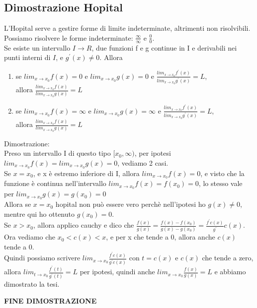 \documentclass[11pt]{article}
\begin{document}
\subsection{Dimostrazione Hopital}
L'Hopital serve a gestire forme di limite indeterminate, altrimenti non risolvibili.\\
Possiamo risolvere le forme indeterminate: $\frac{\infty}{\infty}$ e $\frac{0}{0}$.\\
Se esiste un intervallo $I \rightarrow R$, due funzioni f e g continue in I e derivabili nei punti interni di $I$, e $g^{'}(x) \neq 0$. Allora
\begin{enumerate}
    \item se $lim_{x \rightarrow x_{0}}f(x) = 0$ e $lim_{x \rightarrow x_{0}}g(x) = 0$ e 
    $\frac{lim_{x \rightarrow x_{0}}f^{'}(x)}{lim_{x \rightarrow x_{0}}g^{'}(x)} = L$,\\ allora 
    $\frac{lim_{x \rightarrow x_{0}}f(x)}{lim_{x \rightarrow x_{0}}g(x)} = L$
    \item se $lim_{x \rightarrow x_{0}}f(x) = \infty$ e $lim_{x \rightarrow x_{0}}g(x) = \infty$ e 
    $\frac{lim_{x \rightarrow x_{0}}f^{'}(x)}{lim_{x \rightarrow x_{0}}g^{'}(x)} = L$,\\ allora 
    $\frac{lim_{x \rightarrow x_{0}}f(x)}{lim_{x \rightarrow x_{0}}g(x)} = L$
\end{enumerate}
Dimostrazione:\\
Preso un intervallo I di questo tipo $[x_{0},\infty)$, per ipotesi $lim_{x \rightarrow x_{0}}f(x) = lim_{x \rightarrow x_{0}}g(x) = 0$, vediamo 2 casi.\\
Se $x = x_{0}$, e x è estremo inferiore di I, allora $lim_{x \rightarrow x_{0}}f(x) = 0$, e visto che la funzione è continua nell'intervallo $lim_{x \rightarrow x_{0}}f(x) = f(x_{0}) = 0$, 
lo stesso vale per $lim_{x \rightarrow x_{0}}g(x) = g(x_{0}) = 0$\\
Allora se $x = x_{0}$ hopital non può essere vero perchè nell'ipotesi ho $g(x) \neq 0$, mentre qui ho ottenuto $g(x_{0}) = 0$.\\
Se $x > x_{0}$, allora applico cauchy e dico che $\frac{f(x)}{g(x)} = \frac{f(x)-f(x_{0})}{g(x)-g(x_{0})} = \frac{f^{'}c(x)}{g^{'}}c(x)$.\\
Ora vediamo che $x_{0} < c(x) < x$, e per x che tende a 0, allora anche $c(x)$ tende a 0.\\
Quindi possiamo scrivere $lim_{x \rightarrow x_{0}}\frac{f^{'}c(x)}{g^{'}c(x)}$ con $t = c(x)$ e $c(x)$ che tende a zero, allora $lim_{t \rightarrow x_{0}}\frac{f^{'}(t)}{g^{'}(t)} = L$ per ipotesi, 
quindi anche $lim_{x \rightarrow x_{0}}\frac{f(x)}{g(x)} = L$ e abbiamo dimostrato la tesi.\\
\begin{center}
    \textbf{FINE DIMOSTRAZIONE}
\end{center}
\end{document}

